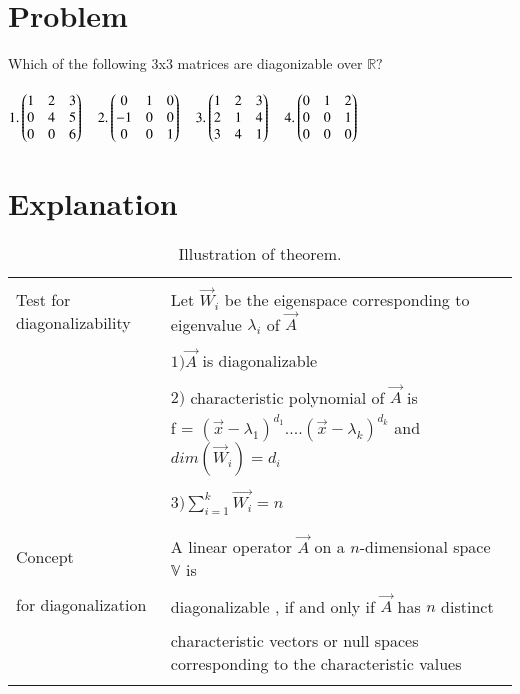 \documentclass[journal,12pt]{IEEEtran}
\begin{document}
\renewcommand{\thefigure}{\theenumi}
\renewcommand{\thetable}{\theenumi}

\section{\textbf{Problem}}
Which of the following 3x3 matrices are diagonizable over $\mathbb{R}?$\\
\\$1.\begin{pmatrix}1&2&3\\0&4&5\\0&0&6\end{pmatrix}\quad 2. \begin{pmatrix}0&1&0\\-1&0&0\\0&0&1\end{pmatrix}\quad 3.\begin{pmatrix}1&2&3\\2&1&4\\3&4&1\end{pmatrix}\quad 4.\begin{pmatrix}0&1&2\\0&0&1\\0&0&0\end{pmatrix}$\\

\section{\textbf{Explanation}}
\renewcommand{\thetable}{1}
\begin{longtable}{|l|l|}
\hline
\multirow{3}{*}{Test for diagonalizability} & \\
& Let $\vec{W}_{i}$ be the eigenspace corresponding to eigenvalue $\lambda_{i}$  of $\vec{A}$\\
&\\
& $1)\vec{A}$ is diagonalizable \\
&\\
& $2)$ characteristic polynomial of $\vec{A}$ is \\
& f = $(\vec{x}-\lambda_1)^{d_1}....(\vec{x}-\lambda_k)^{d_k}$ and $dim(\vec{W}_i) = d_i $\\
&\\
& $3) \sum_{i=1}^{k}\vec{W_i}=n$\\
&\\
\hline
\multirow{3}{*}{Concept} & \\
&
A linear operator $\vec{A}$ on a $n$-dimensional space $\mathbb{V}$ is\\ 
&\\ for diagonalization
& diagonalizable , if and only if $\vec{A}$ has $n$ distinct \\
&\\
& characteristic vectors or null spaces corresponding to the characteristic values\\
\hline
\caption{Illustration of theorem.}
\label{table:1}
\end{longtable}
\newpage
\end{document}
